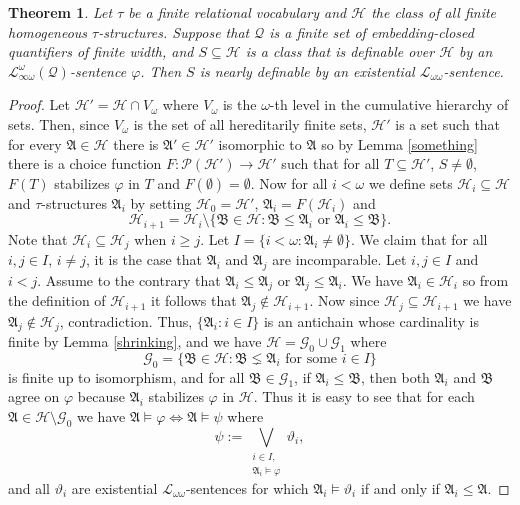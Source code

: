 \documentclass{ndjflart}
\theoremstyle{plain}
\newtheorem{theorem}[conjecture]{Theorem}
\theoremstyle{definition}
\numberwithin{equation}{section}
\begin{document}
\begin{theorem}\label{log_eq}
Let $\tau$ be a finite relational vocabulary and $\mathcal{H}$ the class of all finite homogeneous $\tau$-structures. Suppose that $\mathcal{Q}$ is a finite set of embedding-closed quantifiers of finite width, and $S \subseteq \mathcal{H}$ is a class that is definable over $\mathcal{H}$ by an $\mathcal{L}^{\omega}_{\infty\omega}(\mathcal{Q})$-sentence $\varphi$. Then $S$ is nearly definable by an existential $\mathcal{L}_{\omega\omega}$-sentence.
\end{theorem}
\begin{proof}
Let $\mathcal{H}' = \mathcal{H} \cap V_{\omega}$ where $V_{\omega}$ is the $\omega$-th level in the cumulative hierarchy of sets.
Then, since $V_{\omega}$ is the set of all hereditarily finite sets, $\mathcal{H}'$ is a set such that for every $\mathfrak{A} \in \mathcal{H}$ there is $\mathfrak{A}' \in \mathcal{H}'$ isomorphic to $\mathfrak{A}$ so by Lemma \ref{something} there is a choice function $F\colon \mathcal{P}(\mathcal{H}') \rightarrow \mathcal{H}'$ such that 
for all $T \subseteq \mathcal{H}'$, $S \ne \emptyset$, $F(T)$ stabilizes $\varphi$ in $T$ and $F(\emptyset) = \emptyset$.
Now for all $i < \omega$ we define sets $\mathcal{H}_i \subseteq \mathcal{H}$ and $\tau$-structures $\mathfrak{A}_i$ by setting $\mathcal{H}_0 = \mathcal{H}'$,
$\mathfrak{A}_i = F(\mathcal{H}_i)$ and
\[
\mathcal{H}_{i+1} = \mathcal{H}_i \setminus \{ \mathfrak{B} \in \mathcal{H} \colon \mathfrak{B} \leq \mathfrak{A}_i \text{ or } \mathfrak{A}_i \leq \mathfrak{B} \}.
\] 
Note that $\mathcal{H}_i \subseteq \mathcal{H}_j$ when $i \geq j$.
Let $I = \{i<\omega \colon \mathfrak{A}_i \ne \emptyset \}$.
We claim that for all $i,j \in I$, $i \ne j$, it is the case that $\mathfrak{A}_i$ and $\mathfrak{A}_j$ are incomparable.
Let $i,j \in I$ and $i < j$.
Assume to the contrary that $\mathfrak{A}_i \leq \mathfrak{A}_j$ or $\mathfrak{A}_j \leq \mathfrak{A}_i$.
We have $\mathfrak{A}_i \in \mathcal{H}_i$ so from the definition of $\mathcal{H}_{i+1}$ it follows that $\mathfrak{A}_j \notin \mathcal{H}_{i+1}$.
Now since $\mathcal{H}_j \subseteq \mathcal{H}_{i+1}$ we have $\mathfrak{A}_j \notin \mathcal{H}_j$, contradiction. Thus, $\{\mathfrak{A}_i\colon i\in I \}$ is an antichain whose cardinality is finite by Lemma \ref{shrinking}, and we have
$\mathcal{H} = \mathcal{G}_0 \cup \mathcal{G}_1$ where 
\[
\mathcal{G}_0 = \{\mathfrak{B}\in\mathcal{H} \colon \mathfrak{B} \lneq \mathfrak{A}_i \text{ for some } i \in I \}
\]
is finite up to isomorphism,
and for all $\mathfrak{B} \in \mathcal{G}_1$, 
if $\mathfrak{A}_i\leq\mathfrak{B}$, then both $\mathfrak{A}_i$ and $\mathfrak{B}$ agree on $\varphi$ because $\mathfrak{A}_i$ stabilizes $\varphi$ in $\mathcal{H}$.
Thus it is easy to see that for each $\mathfrak{A}\in\mathcal{H} \setminus \mathcal{G}_0$ we have 
$\mathfrak{A} \vDash \varphi \Leftrightarrow \mathfrak{A} \vDash \psi$ where
\[
\psi := \bigvee_{\substack{i\in I,\\\mathfrak{A}_i\vDash\varphi}}\vartheta_i,
\]
and all $\vartheta_i$ are existential $\mathcal{L}_{\omega \omega}$-sentences for which $\mathfrak{A}_i \vDash \vartheta_i$ if and only if $\mathfrak{A}_i \leq \mathfrak{A}$. 


\end{proof}
\end{document}

